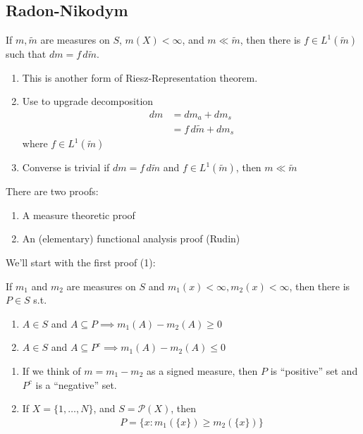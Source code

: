 \subsection{Radon-Nikodym}

\begin{theorem}
	If $m, \tilde{m}$ are measures on $S$, $m(X) < \infty$, and $m \ll \tilde{m}$,
	then there is $f \in L^{1} ( \tilde{m})$ such that $dm = f \, d\tilde{m}$.
\end{theorem}

\begin{remark}
	\begin{enumerate}
		\item This is another form of Riesz-Representation theorem.
		\item Use to upgrade decomposition
			\begin{align*}
				dm &= dm_{a} + dm_s \\
					 &= f \, d\tilde{m} + d m_{s}
			\end{align*} where $f \in L^{1} (\tilde m)$
		\item Converse is trivial if $dm = f \, d \tilde{m}$ and
			$f \in L^1 (\tilde{m} )$, then $m \ll \tilde{m}$
	\end{enumerate}
\end{remark}

\noindent There are two proofs:
\begin{enumerate}
	\item A measure theoretic proof
	\item An (elementary) functional analysis proof (Rudin)
\end{enumerate}
We'll start with the first proof (1):

\begin{theorem} If $m_1$ and $m_2$ are measures on $S$ and $m_1(x) < \infty, m_2 (x) < \infty$, then there is $P \in S$ s.t.
	\begin{enumerate}
		\item $A \in S$ and $A \subseteq P \implies m_1 (A) - m_2 (A) \geq 0$
		\item $A \in S$ and $A \subseteq P^c \implies m_1 (A) - m_2 (A) \leq 0$
	\end{enumerate}
\end{theorem}


\begin{remark}
	\begin{enumerate}
		\item If we think of $m = m_1 - m_2$ as a signed measure, then $P$ is ``positive'' set and $P^c$ is a ``negative'' set.
		\item If $X = \{1, \ldots, N\}$, and $S = \mathcal{P} (X)$, then
			\begin{align*}
				P = \{x : m_{1} (\{x\}) \geq m_2 (\{ x \})\}
			\end{align*}
	\end{enumerate}
\end{remark}

